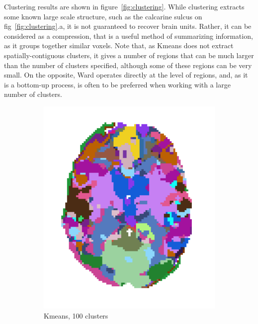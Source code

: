 \documentclass{frontiersSCNS} %
\begin{document}
Clustering results are shown in figure~\ref{fig:clustering}. While
clustering extracts some known large scale structure, such as the
calcarine sulcus on fig~\ref{fig:clustering}.a, it is not guaranteed to
recover brain units. Rather, it can be considered as a compression, that
is a useful method of summarizing information, as it groups together
similar voxels. Note that, as Kmeans does not extract spatially-contiguous
clusters, it gives a number of regions that can be much larger than the
number of clusters specified, although some of these regions can be very
small. On the opposite, Ward operates directly at the level of regions,
and, as it is a bottom-up process, is often to be preferred when working
with a large number of clusters.

\begin{figure}[hbtp]
      \begin{subfigure}[b]{.23\linewidth}
          \includegraphics[width=\linewidth]{img/clustering/kmeans_100}
        \caption{Kmeans, 100 clusters}
      \end{subfigure}
      \hfill
      \begin{subfigure}[b]{.23\linewidth}

\end{subfigure}
\end{figure}
\end{document}
